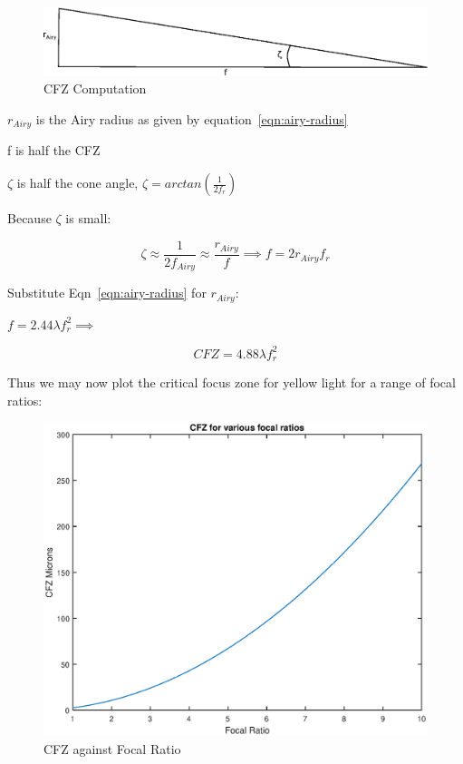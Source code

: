 \documentclass[11pt]{article}
\begin{document}
\begin{figure}[htb]
	\begin{center}
		\includegraphics[]{./images/CFZ-computation.eps}
		\caption{CFZ Computation}
		\label{fig:cfz-computation}
	\end{center}
\end{figure}

$r_{Airy}$ is the Airy radius as given by equation~\ref{eqn:airy-radius}

f is half the CFZ

$\zeta$ is half the cone angle, $\zeta = arctan(\frac{1}{2f_{r}})$

Because $\zeta$ is small:

\Large
\begin{equation}
\zeta \approx \frac{1}{2f_{Airy}} \approx \frac{r_{Airy}}{f} \implies f=2r_{Airy}f_{r}
\label{eqn:physical-spot-size}
\end{equation}
\large

Substitute Eqn~\ref{eqn:airy-radius} for $r_{Airy}$:

$f=2.44\lambda f_{r}^2 \implies$

\begin{equation}
CFZ=4.88\lambda f_{r}^2
\end{equation}

Thus we may now plot the critical focus zone for yellow light for a range of focal ratios:

\begin{figure}[htb]
	\begin{center}
		\includegraphics[scale=0.7]{./images/cfz-fratio.eps}
		\caption{CFZ against Focal Ratio}
		\label{fig:cfz-plot}
	\end{center}
\end{figure}
\end{document}
